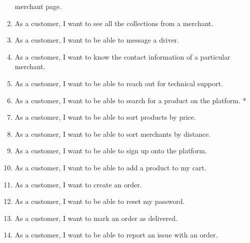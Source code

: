\begin{enumerate}[resume, label=USR-\arabic*]
    merchant page.
    \item As a customer, I want to see all the collections from a merchant.
    \item As a customer, I want to be able to message a driver.
    \item As a customer, I want to know the contact information of a 
    particular merchant.
    \item As a customer, I want to be able to reach out for technical support.
    \item As a customer, I want to be able to search for a product on the 
    platform. *
    \item As a customer, I want to be able to sort products by price.
    \item As a customer, I want to be able to sort merchants by distance.
    \item As a customer, I want to be able to sign up onto the platform.
    \item As a customer, I want to be able to add a product to my cart.
    \item As a customer, I want to create an order.
    \item As a customer, I want to be able to reset my password.
    \item As a customer, I want to mark an order as delivered.
    \item As a customer, I want to be able to report an issue with an order.
\end{enumerate}
\pagebreak
